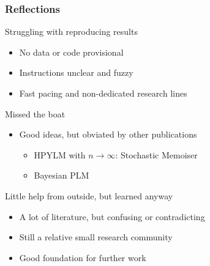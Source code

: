 \documentclass{beamer}
\begin{document}
\begin{frame}
    \frametitle{Reflections}

    \begin{block}{Struggling with reproducing results}
        \begin{itemize}
            \item No data or code provisional
            \item Instructions unclear and fuzzy
            \item Fast pacing and non-dedicated research lines
        \end{itemize}
    \end{block}

    \begin{block}{Missed the boat}
        \begin{itemize}
            \item Good ideas, but obviated by other publications
                \begin{itemize}
                    \item HPYLM with $n\rightarrow\infty$: Stochastic Memoiser
                    \item Bayesian PLM
                \end{itemize}
        \end{itemize}
    \end{block}

    \begin{block}{}
        Little help from outside, but learned anyway
        \begin{itemize}
            \item A lot of literature, but confusing or contradicting
            \item Still a relative small research community
            \item Good foundation for further work
        \end{itemize}

    \end{block}
\end{frame}
\end{document}
